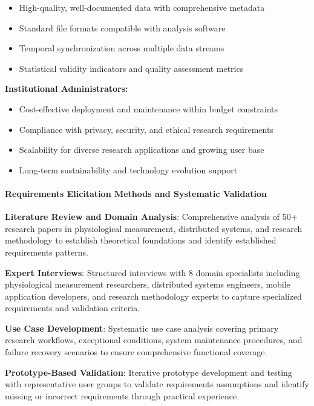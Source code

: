 \documentclass[12pt,a4paper]{report}
\begin{document}
\begin{itemize}
\item High-quality, well-documented data with comprehensive metadata
\item Standard file formats compatible with analysis software
\item Temporal synchronization across multiple data streams
\item Statistical validity indicators and quality assessment metrics

\end{itemize}
\textbf{Institutional Administrators:}

\begin{itemize}
\item Cost-effective deployment and maintenance within budget constraints
\item Compliance with privacy, security, and ethical research requirements
\item Scalability for diverse research applications and growing user base
\item Long-term sustainability and technology evolution support

\end{itemize}
\paragraph{Requirements Elicitation Methods and Systematic Validation}

\textbf{Literature Review and Domain Analysis}: Comprehensive analysis of 50+ research papers in physiological measurement,
distributed systems, and research methodology to establish theoretical foundations and identify established requirements
patterns.

\textbf{Expert Interviews}: Structured interviews with 8 domain specialists including physiological measurement researchers,
distributed systems engineers, mobile application developers, and research methodology experts to capture specialized
requirements and validation criteria.

\textbf{Use Case Development}: Systematic use case analysis covering primary research workflows, exceptional conditions,
system maintenance procedures, and failure recovery scenarios to ensure comprehensive functional coverage.

\textbf{Prototype-Based Validation}: Iterative prototype development and testing with representative user groups to validate
requirements assumptions and identify missing or incorrect requirements through practical experience.
\end{document}
